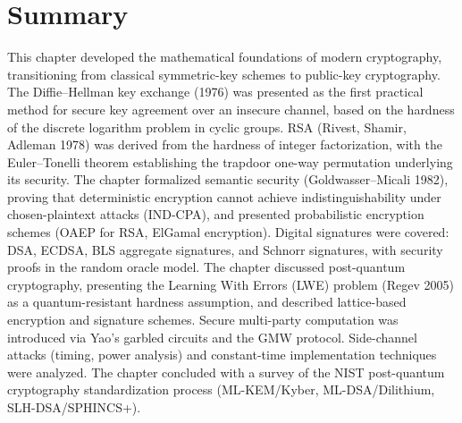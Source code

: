 \section{Summary}
\label{sec:crypto:summary}

This chapter developed the mathematical foundations of modern cryptography, transitioning from classical symmetric-key schemes to public-key cryptography. The Diffie--Hellman key exchange (1976) was presented as the first practical method for secure key agreement over an insecure channel, based on the hardness of the discrete logarithm problem in cyclic groups. RSA (Rivest, Shamir, Adleman 1978) was derived from the hardness of integer factorization, with the Euler--Tonelli theorem establishing the trapdoor one-way permutation underlying its security. The chapter formalized semantic security (Goldwasser--Micali 1982), proving that deterministic encryption cannot achieve indistinguishability under chosen-plaintext attacks (IND-CPA), and presented probabilistic encryption schemes (OAEP for RSA, ElGamal encryption). Digital signatures were covered: DSA, ECDSA, BLS aggregate signatures, and Schnorr signatures, with security proofs in the random oracle model. The chapter discussed post-quantum cryptography, presenting the Learning With Errors (LWE) problem (Regev 2005) as a quantum-resistant hardness assumption, and described lattice-based encryption and signature schemes. Secure multi-party computation was introduced via Yao's garbled circuits and the GMW protocol. Side-channel attacks (timing, power analysis) and constant-time implementation techniques were analyzed. The chapter concluded with a survey of the NIST post-quantum cryptography standardization process (ML-KEM/Kyber, ML-DSA/Dilithium, SLH-DSA/SPHINCS+).


